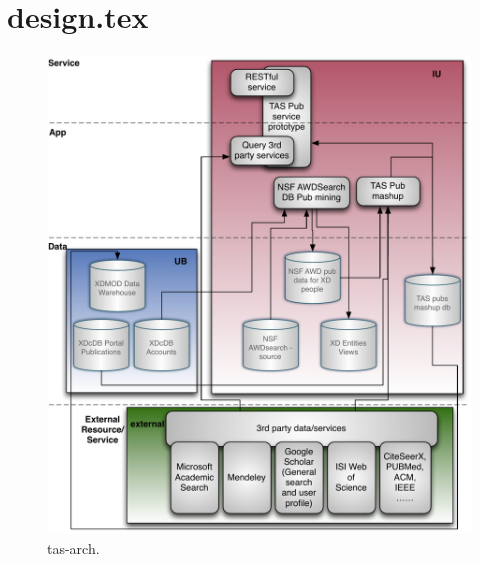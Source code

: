 \section{design.tex}



\begin{figure}[htb]
  \centering
    \includegraphics[width=1.0\columnwidth]{images/tas-arch.pdf}
  \caption{tas-arch.}\label{F:tas-arch}
\end{figure}


